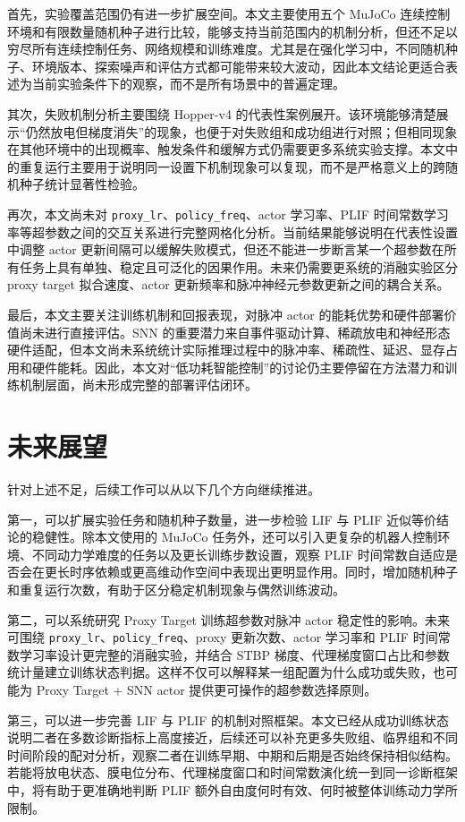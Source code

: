 \documentclass[UTF8,zihao=-4,oneside,openany]{ctexbook}
\begin{document}
首先，实验覆盖范围仍有进一步扩展空间。本文主要使用五个 MuJoCo 连续控制环境和有限数量随机种子进行比较，能够支持当前范围内的机制分析，但还不足以穷尽所有连续控制任务、网络规模和训练难度。尤其是在强化学习中，不同随机种子、环境版本、探索噪声和评估方式都可能带来较大波动，因此本文结论更适合表述为当前实验条件下的观察，而不是所有场景中的普遍定理。

其次，失败机制分析主要围绕 Hopper-v4 的代表性案例展开。该环境能够清楚展示“仍然放电但梯度消失”的现象，也便于对失败组和成功组进行对照；但相同现象在其他环境中的出现概率、触发条件和缓解方式仍需要更多系统实验支撑。本文中的重复运行主要用于说明同一设置下机制现象可以复现，而不是严格意义上的跨随机种子统计显著性检验。

再次，本文尚未对 \texttt{proxy\_lr}、\texttt{policy\_freq}、actor 学习率、PLIF 时间常数学习率等超参数之间的交互关系进行完整网格化分析。当前结果能够说明在代表性设置中调整 actor 更新间隔可以缓解失败模式，但还不能进一步断言某一个超参数在所有任务上具有单独、稳定且可泛化的因果作用。未来仍需要更系统的消融实验区分 proxy target 拟合速度、actor 更新频率和脉冲神经元参数更新之间的耦合关系。

最后，本文主要关注训练机制和回报表现，对脉冲 actor 的能耗优势和硬件部署价值尚未进行直接评估。SNN 的重要潜力来自事件驱动计算、稀疏放电和神经形态硬件适配，但本文尚未系统统计实际推理过程中的脉冲率、稀疏性、延迟、显存占用和硬件能耗。因此，本文对“低功耗智能控制”的讨论仍主要停留在方法潜力和训练机制层面，尚未形成完整的部署评估闭环。

\section{未来展望}
针对上述不足，后续工作可以从以下几个方向继续推进。

第一，可以扩展实验任务和随机种子数量，进一步检验 LIF 与 PLIF 近似等价结论的稳健性。除本文使用的 MuJoCo 任务外，还可以引入更复杂的机器人控制环境、不同动力学难度的任务以及更长训练步数设置，观察 PLIF 时间常数自适应是否会在更长时序依赖或更高维动作空间中表现出更明显作用。同时，增加随机种子和重复运行次数，有助于区分稳定机制现象与偶然训练波动。

第二，可以系统研究 Proxy Target 训练超参数对脉冲 actor 稳定性的影响。未来可围绕 \texttt{proxy\_lr}、\texttt{policy\_freq}、proxy 更新次数、actor 学习率和 PLIF 时间常数学习率设计更完整的消融实验，并结合 STBP 梯度、代理梯度窗口占比和参数统计量建立训练状态判据。这样不仅可以解释某一组配置为什么成功或失败，也可能为 Proxy Target + SNN actor 提供更可操作的超参数选择原则。

第三，可以进一步完善 LIF 与 PLIF 的机制对照框架。本文已经从成功训练状态说明二者在多数诊断指标上高度接近，后续还可以补充更多失败组、临界组和不同时间阶段的配对分析，观察二者在训练早期、中期和后期是否始终保持相似结构。若能将放电状态、膜电位分布、代理梯度窗口和时间常数演化统一到同一诊断框架中，将有助于更准确地判断 PLIF 额外自由度何时有效、何时被整体训练动力学所限制。
\end{document}
